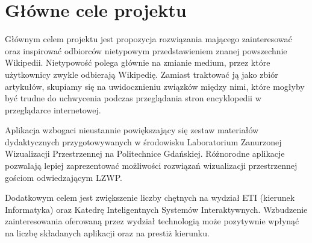 \section{Główne cele projektu}
Głównym celem projektu jest propozycja rozwiązania mającego zainteresować oraz inspirować odbiorców nietypowym przedstawieniem znanej powszechnie Wikipedii. Nietypowość polega głównie na zmianie medium, przez które użytkownicy zwykle odbierają Wikipedię. Zamiast traktować ją jako zbiór artykułów, skupiamy się na uwidocznieniu związków między nimi, które mogłyby być trudne do uchwycenia podczas przeglądania stron encyklopedii w przeglądarce internetowej.

Aplikacja wzbogaci nieustannie powiększający się zestaw materiałów dydaktycznych przygotowywanych w środowisku Laboratorium Zanurzonej Wizualizacji Przestrzennej na Politechnice Gdańskiej. Różnorodne aplikacje pozwalają lepiej zaprezentować możliwości rozwiązań wizualizacji przestrzennej gościom odwiedzającym LZWP.

Dodatkowym celem jest zwiększenie liczby chętnych na wydział ETI (kierunek Informatyka) oraz Katedrę Inteligentnych Systemów Interaktywnych. Wzbudzenie zainteresowania oferowaną przez wydział technologią może pozytywnie wpłynąć na liczbę składanych aplikacji oraz na prestiż kierunku.
